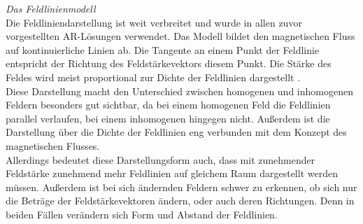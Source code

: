 \textit{Das Feldlinienmodell}\\
Die Feldliniendarstellung ist weit verbreitet und wurde in allen zuvor vorgestellten AR-Lösungen verwendet. Das Modell bildet den magnetischen Fluss auf kontinuierliche Linien ab. Die Tangente an einem Punkt der Feldlinie entspricht der Richtung des Feldstärkevektors diesem Punkt. Die Stärke des Feldes wird meist proportional zur Dichte der Feldlinien dargestellt \cite{Kilian03}.\\

Diese Darstellung macht den Unterschied zwischen homogenen und inhomogenen Feldern besonders gut sichtbar, da bei einem homogenen Feld die Feldlinien parallel verlaufen, bei einem inhomogenen hingegen nicht. Außerdem ist die Darstellung über die Dichte der Feldlinien eng verbunden mit dem Konzept des magnetischen Flusses.\\

Allerdings bedeutet diese Darstellungsform auch, dass mit zunehmender Feldstärke zunehmend mehr Feldlinien auf gleichem Raum dargestellt werden müssen. Außerdem ist bei sich ändernden Feldern schwer zu erkennen, ob sich nur die Beträge der Feldstärkevektoren ändern, oder auch deren Richtungen. Denn in beiden Fällen verändern sich Form und Abstand der Feldlinien.\\

